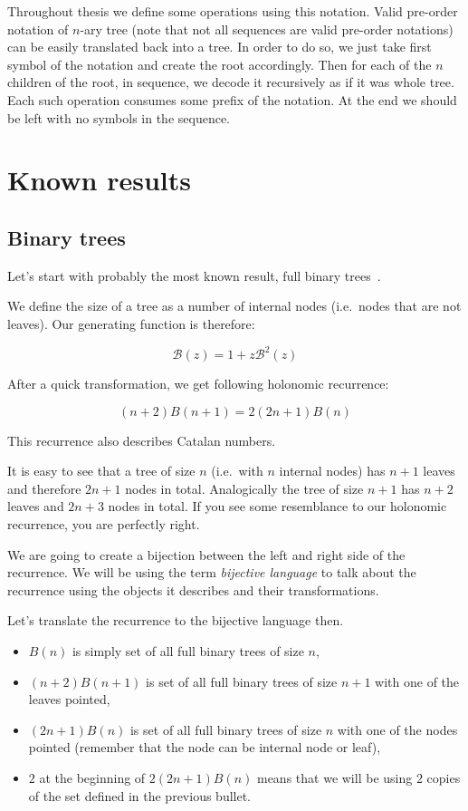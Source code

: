 \documentclass[final]{article}
\theoremstyle{definition}
\theoremstyle{remark}
\newcommand{\gf}[1]{\ensuremath{\mathcal{#1}}}
\begin{document}
Throughout thesis we define some operations using this notation. Valid pre-order notation of \(n\)-ary tree (note that not all sequences are valid pre-order notations) can be easily translated back into a tree. In order to do so, we just take first symbol of the notation and create the root accordingly. Then for each of the \(n\) children of the root, in sequence, we decode it recursively as if it was whole tree. Each such operation consumes some prefix of the notation. At the end we should be left with no symbols in the sequence.

\section{Known results}%
\label{sec:known_results}

\subsection{Binary trees}%
\label{sub:binary_trees}



Let's start with probably the most known result, full binary trees~\cite{binary}.

We define the size of a tree as a number of internal nodes (i.e.\ nodes that are not leaves). Our generating function is therefore:

\[\gf{B}(z) = 1 + z\gf{B}^2(z)\]

After a quick transformation, we get following holonomic recurrence:

\[(n + 2)B(n + 1) = 2 (2n + 1)B(n)\]

This recurrence also describes Catalan numbers.

It is easy to see that a tree of size \(n\) (i.e.\ with \(n\) internal nodes) has \(n + 1\) leaves and therefore \(2n + 1\) nodes in total. Analogically the tree of size \(n + 1\) has \(n + 2\) leaves and \(2n + 3\) nodes in total. If you see some resemblance to our holonomic recurrence, you are perfectly right.

We are going to create a bijection between the left and right side of the recurrence. We will be using the term \textit{bijective language} to talk about the recurrence using the objects it describes and their transformations.

Let's translate the recurrence to the bijective language then.
\begin{itemize}
    \item \(B(n)\) is simply set of all full binary trees of size \(n\),
    \item \((n + 2) B(n + 1)\) is set of all full binary trees of size \(n + 1\) with one of the leaves pointed,
    \item \((2n + 1) B(n)\) is set of all full binary trees of size \(n\) with one of the nodes pointed (remember that the node can be internal node or leaf),
    \item \(2\) at the beginning of \(2 (2n + 1) B(n)\) means that we will be using \(2\) copies of the set defined in the previous bullet.
\end{itemize}
\end{document}

